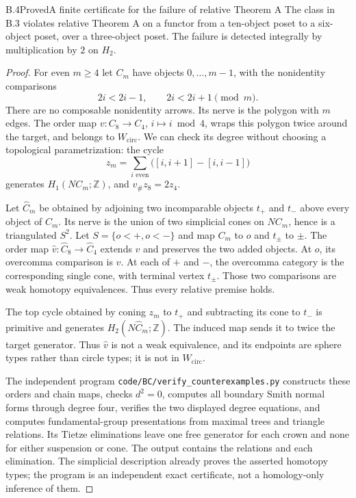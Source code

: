 \begin{claim}{B.4}{Proved}{A finite certificate for the failure of relative Theorem A}
The class in B.3 violates relative Theorem A on a functor from a ten-object
poset to a six-object poset, over a three-object poset. The failure is
detected integrally by multiplication by $2$ on $H_2$.
\end{claim}
\begin{proof}
For even $m\ge4$ let $C_m$ have objects $0,\ldots,m-1$, with the
nonidentity comparisons
\[
 2i<2i-1,\qquad 2i<2i+1\pmod m.
\]
There are no composable nonidentity arrows. Its nerve is the polygon
with $m$ edges. The order map $v:C_8\to C_4$, $i\mapsto i\bmod4$,
wraps this polygon twice around the target, and belongs to
$W_{\mathrm{circ}}$. We can check its degree without choosing a
topological parametrization: the cycle
\[
 z_m=\sum_{i\text{ even}}\bigl([i,i+1]-[i,i-1]\bigr)
\]
generates $H_1(NC_m;\mathbb Z)$, and $v_\#z_8=2z_4$.

Let $\widehat C_m$ be obtained by adjoining two incomparable objects
$t_+$ and $t_-$ above every object of $C_m$. Its nerve is the union of
two simplicial cones on $NC_m$, hence is a triangulated $S^2$. Let
$S=\{o<+, o<-\}$ and map $C_m$ to $o$ and $t_\pm$ to $\pm$.
The order map $\widehat v:\widehat C_8\to\widehat C_4$ extends $v$
and preserves the two added objects. At $o$, its overcomma comparison
is $v$. At each of $+$ and $-$, the overcomma category is the corresponding
single cone, with terminal vertex $t_\pm$. Those two comparisons are
weak homotopy equivalences. Thus every relative premise holds.

The top cycle obtained by coning $z_m$ to $t_+$ and subtracting its cone
to $t_-$ is primitive and generates $H_2(N\widehat C_m;\mathbb Z)$.
The induced map sends it to twice the target generator. Thus
$\widehat v$ is not a weak equivalence, and its endpoints are sphere
types rather than circle types; it is not in $W_{\mathrm{circ}}$.

The independent program \texttt{code/BC/verify\_counterexamples.py}
constructs these orders and chain maps, checks $d^2=0$, computes all
boundary Smith normal forms through degree four, verifies the two
displayed degree equations, and computes fundamental-group presentations
from maximal trees and triangle relations. Its Tietze eliminations leave
one free generator for each crown and none for either suspension or cone.
The output contains the relations and each elimination. The simplicial
description already proves the asserted homotopy types; the program is
an independent exact certificate, not a homology-only inference of them.
\end{proof}

